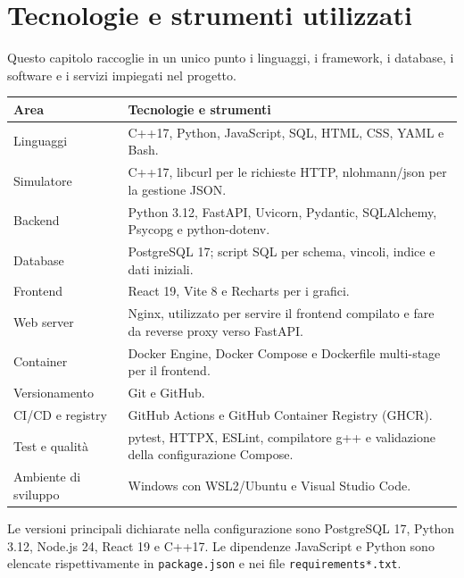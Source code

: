 \chapter{Tecnologie e strumenti utilizzati}

Questo capitolo raccoglie in un unico punto i linguaggi, i framework, i database, i software e i servizi impiegati nel progetto.

\begin{longtable}{p{}p{}}
\toprule
\textbf{Area} & \textbf{Tecnologie e strumenti}\\
\midrule
Linguaggi & C++17, Python, JavaScript, SQL, HTML, CSS, YAML e Bash.\\
Simulatore & C++17, libcurl per le richieste HTTP, nlohmann/json per la gestione JSON.\\
Backend & Python 3.12, FastAPI, Uvicorn, Pydantic, SQLAlchemy, Psycopg e python-dotenv.\\
Database & PostgreSQL 17; script SQL per schema, vincoli, indice e dati iniziali.\\
Frontend & React 19, Vite 8 e Recharts per i grafici.\\
Web server & Nginx, utilizzato per servire il frontend compilato e fare da reverse proxy verso FastAPI.\\
Container & Docker Engine, Docker Compose e Dockerfile multi-stage per il frontend.\\
Versionamento & Git e GitHub.\\
CI/CD e registry & GitHub Actions e GitHub Container Registry (GHCR).\\
Test e qualità & pytest, HTTPX, ESLint, compilatore g++ e validazione della configurazione Compose.\\
Ambiente di sviluppo & Windows con WSL2/Ubuntu e Visual Studio Code.\\
\bottomrule
\end{longtable}

Le versioni principali dichiarate nella configurazione sono PostgreSQL 17, Python 3.12, Node.js 24, React 19 e C++17. Le dipendenze JavaScript e Python sono elencate rispettivamente in \texttt{package.json} e nei file \texttt{requirements*.txt}.
